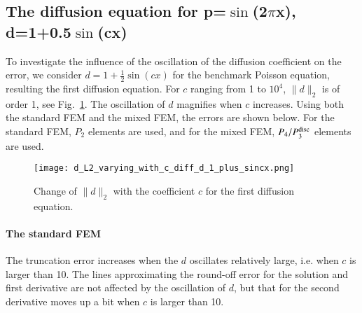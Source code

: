 \documentclass[review,3p]{elsarticle}
\begin{document}


\newpage

\subsection{\texorpdfstring{The diffusion equation for p=$\sin$(2$\pi$x), d=1+0.5$\sin$(cx)}{The diffusion equation for p=sin(2pix), d=1+0.5sin(cx)}}

To investigate the influence of the oscillation of the diffusion coefficient on the error, we consider $d=1+\frac{1}{2}\sin(cx)$ for the benchmark Poisson equation, resulting the first diffusion equation.
For $c$ ranging from 1 to $10^4$, $\|d\|_2$ is of order 1, see Fig.~\ref{Fig:d_L2_varying_with_c_diff_d_1_plus_sincx}.
The oscillation of $d$ magnifies when $c$ increases.
Using both the standard FEM and the mixed FEM, the errors are shown below.
For the standard FEM, $P_2$ elements are used, and for the mixed FEM, $P_4/P_3^{\rm disc}$ elements are used.

\begin{figure}[!ht]
\centering
    \texttt{[image: d\_L2\_varying\_with\_c\_diff\_d\_1\_plus\_sincx.png]}
    \caption{Change of $\|d\|_2$ with the coefficient $c$ for the first diffusion equation.}
    \label{Fig:d_L2_varying_with_c_diff_d_1_plus_sincx}   
\end{figure}

\paragraph{The standard FEM}

The truncation error increases when the $d$ oscillates relatively large, i.e. when $c$ is larger than 10.
The lines approximating the round-off error for the solution and first derivative are not affected by the oscillation of $d$, but that for the second derivative moves up a bit when  $c$ is larger than 10.


\end{document}
